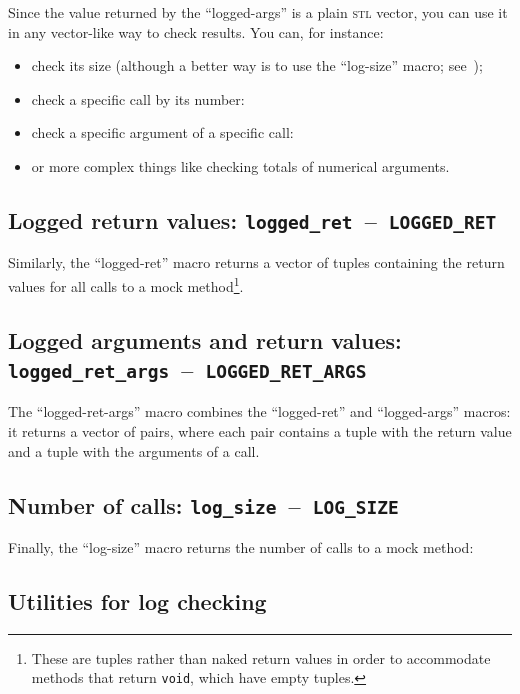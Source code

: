 \documentclass[twoside, a4paper, article]{memoir}
\newcommand*\testudocolor{\color{red!80!blue}}
\newcommand*\testudo[1]{\texttt{\testudocolor{}#1}}
\newcommand*\testudopair[2]{\testudo{#1}~--~\testudo{#2}}
\newcommand\subsectiontestudopair[3]{%
  \subsection[#1]{#1: \testudopair{#2}{#3}}}
\providecommand\typesetexample[1]{%
}
\begin{document}
\typesetexample{check-mock-method-logs}

Since the value returned by the ``logged-args'' is a plain \textsc{stl} vector,
you can use it in any vector-like way to check results.  You can, for instance:
\begin{itemize}
\item check its size (although a better way is to use the ``log-size'' macro;
  see~);
\item check a specific call by its number:

  \typesetexample{check-mock-method-logs-specific-call}

\item check a specific argument of a specific call:

  \typesetexample{check-mock-method-logs-specific-call-specific-argument}

\item or more complex things like checking totals of numerical arguments.
\end{itemize}

\subsectiontestudopair{Logged return values}{logged\_ret}{LOGGED\_RET}

Similarly, the ``logged-ret'' macro returns a vector of tuples containing the
return values for all calls to a mock method\footnote{These are tuples rather
  than naked return values in order to accommodate methods that return
  \texttt{void}, which have empty tuples.}.

\typesetexample{check-mock-method-logs-return-values}

\subsectiontestudopair{Logged arguments and return values}%
  {logged\_ret\_args}{LOGGED\_RET\_ARGS}

The ``logged-ret-args'' macro combines the ``logged-ret'' and ``logged-args''
macros: it returns a vector of pairs, where each pair contains a tuple with the
return value and a tuple with the arguments of a call.

\typesetexample{check-mock-method-logs-return-arguments-values}

\subsectiontestudopair{Number of calls}{log\_size}{LOG\_SIZE}
\label{sec:mock-method-number-of-calls}

Finally, the ``log-size'' macro returns the number of calls to a mock method:

\typesetexample{check-mock-method-logs-number-of-calls}


\subsection{Utilities for log checking}
\label{sec:utilities-log-checking}
\end{document}
